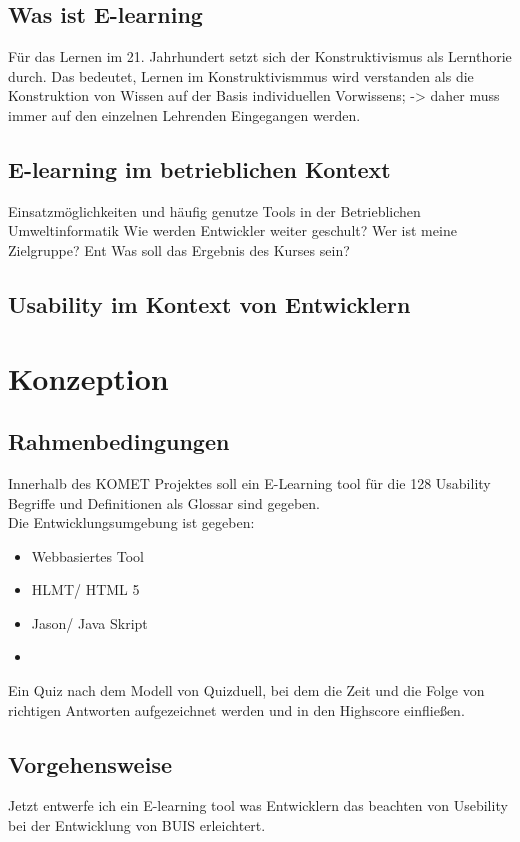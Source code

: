 \documentclass[a4paper, 12pt, twoside, BCOR=20mm, DIV=calc, abstracton, parskip=half*, toc=bibliography, toc=listof, headsepline, headings=small, numbers=enddot]{scrreprt} %
\begin{document}
\section{Was ist E-learning}
Für das Lernen im 21. Jahrhundert setzt sich der Konstruktivismus als Lernthorie durch. Das bedeutet, Lernen im Konstruktivismmus wird verstanden als die Konstruktion von Wissen auf der Basis individuellen Vorwissens; -> daher muss immer auf den einzelnen Lehrenden Eingegangen werden. \cite[S.8]{1}

\section{E-learning im betrieblichen Kontext}
Einsatzmöglichkeiten und häufig genutze Tools in der Betrieblichen Umweltinformatik 
Wie werden Entwickler weiter geschult?
Wer ist meine Zielgruppe?  Ent
Was soll das Ergebnis des Kurses sein?

\section{Usability im Kontext von Entwicklern}
\section{}

\chapter{Konzeption}
\section{Rahmenbedingungen}
Innerhalb des KOMET Projektes soll ein E-Learning tool für die 128 Usability Begriffe und Definitionen als Glossar sind gegeben. \\Die Entwicklungsumgebung ist gegeben:
\begin{itemize}
\item{Webbasiertes Tool}
\item{HLMT/ HTML 5}
\item{Jason/ Java Skript}
\item 
\end{itemize}

Ein Quiz nach dem Modell von Quizduell, bei dem die Zeit und die Folge von richtigen Antworten aufgezeichnet werden und in den Highscore einfließen.

\section{Vorgehensweise}
Jetzt entwerfe ich ein E-learning tool was Entwicklern das beachten von
Usebility bei der Entwicklung von BUIS erleichtert. 
\end{document}
